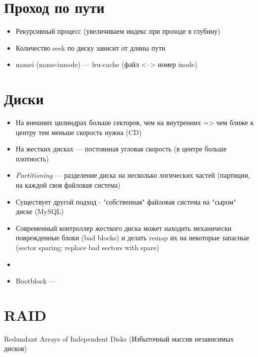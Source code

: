 \documentclass[../../lectures.tex]{subfiles}
\begin{document}
\section{Проход по пути}
\begin{itemize}
    \item Рекурсивный процесс (увеличиваем индекс при проходе в глубину)
    \item Количество seek по диску зависит от длины пути
    \item namei (name-innode) --- lru-cache (файл <--> номер inode)
\end{itemize}

\section{Диски}
\begin{itemize}
    \item На внешних цилиндрах больше секторов, чем на внутренних 
          => чем ближе к центру тем меньше скорость нужна (CD)
    \item На жестких дисках --- постоянная угловая скорость 
          (в центре больше плотность)
    \item \emph{Partitioning} --- разделение диска на несколько 
          логических частей (партиции, на каждой своя файловая система)
    \item Существует другой подход - "собственная" файловая система 
          на "сыром" диске (MySQL)
    \item Современный контроллер жесткого диска может находить механически поврежденные блоки (bad blocks) и делать remap их на некоторые запасные (sector sparing: replace bad sectors with spare)
    \item {}
    \item Bootblock --- \todo{}
\end{itemize}

\newpage
\section{RAID}
Redundant Arrays of Independent Disks (Избыточный массив независимых дисков)
\end{document}
